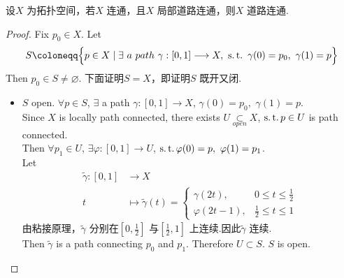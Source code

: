 	\begin{proposition}\label{prop 2.3.12}
		设$X$ 为拓扑空间，若$X$ 连通，且$X$ 局部道路连通，则$X$ 道路连通.
		
		\vspace{2em}
		\begin{proof}
			Fix $p_0 \in X$. Let
			\begin{align}
				S \coloneqq \Big\{ p \in X \mid \exists \,\, a \,\, path \,\, \gamma : [0 , 1] \longrightarrow X , \,\, \st \,\, \gamma(0) = p_0 , \,\, \gamma(1) = p \Big\}
			\end{align}
			Then $p_0 \in S \neq \varnothing$. 下面证明$S = X$，即证明$S$ 既开又闭.
			\begin{itemize}
				\item $S$ open. $\forall p \in S$, $\exists$ a path $\gamma : [0 , 1] \longrightarrow X$, $\gamma(0) = p_0 , \,\, \gamma(1) = p$.\\
				Since $X$ is locally path connected, there exists $U \underset{open}{\subset} X$, $\operatorname{s.t.} p \in U$ is path connected.\\
				Then $\forall p_1 \in U$, $\exists \varphi : [0 , 1] \longrightarrow U$, $\operatorname{s.t.} \varphi(0) = p , \,\, \varphi(1) = p_1$.\\
				Let
				\begin{align}
					\widetilde{\gamma} : [0 , 1] &\longrightarrow X \\
					t &\longmapsto \widetilde{\gamma}(t) = 
					\begin{cases}
						\gamma(2t) , \,\, &0 \leq t \leq \frac{1}{2}\\
						\varphi(2t - 1) , &\frac{1}{2} \leq t \leq 1
					\end{cases}
				\end{align}
				由粘接原理，$\widetilde{\gamma}$ 分别在$[0 , \frac{1}{2}]$ 与$[\frac{1}{2} , 1]$ 上连续.因此$\widetilde{\gamma}$ 连续.\\
				Then $\widetilde{\gamma}$ is a path connecting $p_0$ and $p_1$. Therefore $U \subset S$. $S$ is open.
				

\end{itemize}
\end{proof}
\end{proposition}
